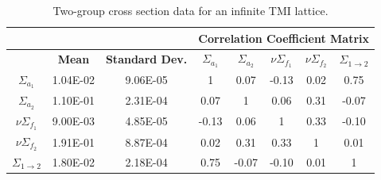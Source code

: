 \begin{table}[!htb]
\caption{\label{table:infintie_lattice_tmi_data} 
Two-group cross section data for an infinite TMI lattice.}
\centering
\begin{tabular}{||c||c|c|c|c|c|c|c||} 
\hline \hline
  &  &  & \multicolumn{5}{|c||}{\textbf{Correlation Coefficient Matrix}}  \\ \hline
  & \textbf{Mean} & \textbf{Standard Dev.} & $\Sigma_{a_1}$ & $\Sigma_{a_2}$ & 
  $\nu\Sigma_{f_1}$ & $\nu\Sigma_{f_2}$ & $\Sigma_{1\rightarrow 2}$ \\ \hline \hline
$\Sigma_{a_1}$ & 1.04E-02 & 9.06E-05 & 1 & 0.07 & -0.13 & 0.02 & 0.75 \\ \hline
$\Sigma_{a_2}$ & 1.10E-01 & 2.31E-04 & 0.07  &  1     & 0.06  & 0.31 & -0.07 \\ \hline
$\nu\Sigma_{f_1}$ & 9.00E-03 & 4.85E-05 & -0.13 &  0.06  & 1     & 0.33 & -0.10 \\ \hline
$\nu\Sigma_{f_2}$ & 1.91E-01 & 8.87E-04 & 0.02  &  0.31  & 0.33  & 1    & 0.01 \\ \hline
$\Sigma_{1\rightarrow 2}$ & 1.80E-02 & 2.18E-04 & 0.75  &  -0.07 & -0.10 & 0.01 & 1 \\ \hline \hline
\end{tabular}
\end{table}

